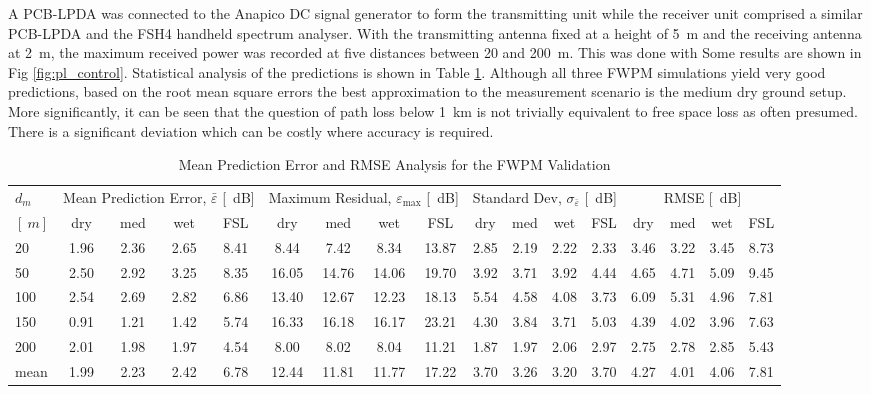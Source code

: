 \documentclass[10pt,journal,twoside]{IEEEtran}
\renewcommand{\arraystretch}{1.3}
\begin{document}
%
A PCB-LPDA was connected to the Anapico DC signal generator to form the transmitting unit while the receiver unit comprised a similar PCB-LPDA and the FSH4 handheld spectrum analyser. With the transmitting antenna fixed at a height of \SI{5}{m} and the receiving antenna at \SI{2}{m}, the maximum received power was recorded at five distances between \SI{20}{} and \SI{200}{m}. This was done with Some results are shown in Fig \ref{fig:pl_control}. Statistical analysis of the predictions is shown in Table \ref{tb:stats1}. Although all three FWPM simulations yield very good predictions, based on the root mean square errors the best approximation to the measurement scenario is the medium dry ground setup. More significantly, it can be seen that the question of path loss below \SI{1}{km} is not trivially equivalent to free space loss as often presumed. There is a significant deviation which can be costly where accuracy is required.
%
\begin{table}%
	\caption{Mean Prediction Error and RMSE Analysis for the FWPM Validation}
	\label{tb:stats1}
	\centering
	\renewcommand{\arraystretch}{1.3}
	\setlength{\tabcolsep}{3pt}
	\begin{tabular*}{\linewidth}{ @{\extracolsep{\fill}} l*{16}c @{}}\toprule %
		$d_m$ & \multicolumn{4}{c}{Mean Prediction Error, $\bar\varepsilon$ [\SI{}{dB}]} & \multicolumn{4}{c}{Maximum Residual, $\varepsilon_{\text{max}}$ [\SI{}{dB}]} & \multicolumn{4}{c}{Standard Dev, $\sigma_{\bar\varepsilon}$ [\SI{}{dB}]} & \multicolumn{4}{c}{RMSE [\SI{}{dB}]}\\ \cmidrule{1-1} \cmidrule{2-5} \cmidrule{6-9} \cmidrule{10-13} \cmidrule{14-17}%
		 $[\SI{}{m}]$ & dry & med & wet & FSL  & dry & med & wet & FSL & dry & med & wet & FSL & dry & med & wet & FSL\\ \cmidrule{1-1} \cmidrule{2-5} \cmidrule{6-9} \cmidrule{10-13} \cmidrule{14-17}
		20 & 1.96 & 2.36 & 2.65 & 8.41 &{} 8.44 & 7.42 & 8.34 & 13.87 &{} 2.85 & 2.19 & 2.22 & 2.33 &{} 3.46 & 3.22 & 3.45 & 8.73\\
		50 & 2.50 & 2.92 & 3.25 & 8.35 &{} 16.05 & 14.76 & 14.06 & 19.70 &{} 3.92 & 3.71 & 3.92 & 4.44 &{} 4.65 & 4.71 & 5.09 & 9.45\\
		100 & 2.54 & 2.69 & 2.82 & 6.86 &{} 13.40 & 12.67 & 12.23 & 18.13 &{} 5.54 & 4.58 & 4.08 & 3.73 &{} 6.09 & 5.31 & 4.96 & 7.81\\
		150 & 0.91 &  1.21 & 1.42 & 5.74 &{} 16.33 & 16.18 & 16.17 & 23.21 &{} 4.30 & 3.84 & 3.71 & 5.03 &{} 4.39 & 4.02 & 3.96 & 7.63\\
		200 & 2.01 & 1.98 & 1.97 & 4.54 &{} 8.00 & 8.02 & 8.04 & 11.21 &{} 1.87 & 1.97 & 2.06 & 2.97 &{} 2.75 & 2.78 & 2.85  & 5.43\\ \cmidrule{1-1} \cmidrule{2-5} \cmidrule{6-9} \cmidrule{10-13} \cmidrule{14-17}
		mean & 1.99 & 2.23 & 2.42 & 6.78 &{} 12.44 & 11.81 & 11.77 & 17.22 &{} 3.70 & 3.26 & 3.20 & 3.70 &{} 4.27 & 4.01 & 4.06 & 7.81\\ \bottomrule
	\end{tabular*}
\end{table}
%
\end{document}
